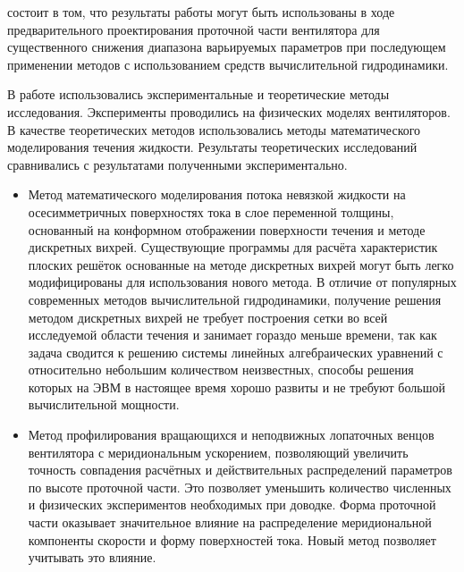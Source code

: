 {\influence}
состоит в том, что результаты работы могут быть использованы в ходе предварительного проектирования проточной части вентилятора для существенного снижения диапазона варьируемых параметров при последующем применении методов с использованием средств вычислительной гидродинамики.

{\methods} В работе использовались экспериментальные и теоретические методы исследования. Эксперименты проводились на физических моделях вентиляторов. В качестве теоретических методов использовались методы математического моделирования течения жидкости. Результаты теоретических исследований сравнивались с результатами полученными экспериментально.

{}
\begin{itemize}[beginpenalty=10000] %
	\item 
	Метод математического моделирования потока невязкой жидкости на осесимметричных поверхностях тока в слое переменной толщины, основанный на конформном отображении поверхности течения и методе дискретных вихрей. Существующие программы для расчёта характеристик плоских решёток основанные на методе дискретных вихрей могут быть легко модифицированы для использования нового метода. В отличие от популярных современных методов вычислительной гидродинамики, получение решения методом дискретных вихрей не требует построения сетки во всей исследуемой области течения и занимает гораздо меньше времени, так как задача сводится к решению системы линейных алгебраических уравнений с относительно небольшим количеством неизвестных, способы решения которых на ЭВМ в настоящее время хорошо развиты и не требуют большой вычислительной мощности.
	
	\item 
	Метод профилирования вращающихся и неподвижных лопаточных венцов вентилятора с меридиональным ускорением, позволяющий увеличить точность совпадения расчётных и действительных распределений параметров по высоте проточной части. Это позволяет уменьшить количество численных и физических экспериментов необходимых при доводке. Форма проточной части оказывает значительное влияние на распределение меридиональной компоненты скорости и форму поверхностей тока. Новый метод позволяет учитывать это влияние.
	

\end{itemize}
